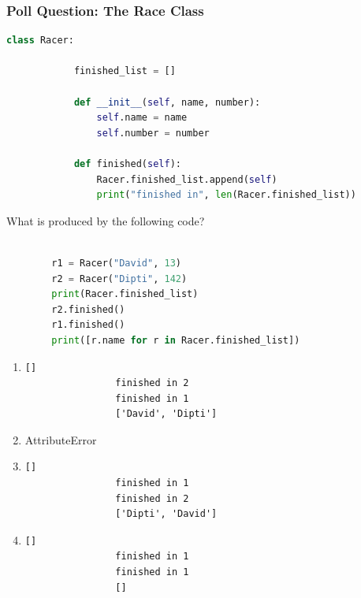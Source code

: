 \documentclass{beamer}
\begin{document}
%
%
%
\begin{frame}[fragile]
	\frametitle{Poll Question: The Race Class}
	\begin{minipage}{0.69\textwidth}
		\begin{lstlisting}[language=Python, autogobble, basicstyle=\tiny]
		class Racer:

			finished_list = []

			def __init__(self, name, number):
				self.name = name
				self.number = number

			def finished(self):
				Racer.finished_list.append(self)
				print("finished in", len(Racer.finished_list))

		\end{lstlisting}
		\pause
		\vspace{0.5cm}
		What is produced by the following code?
		\vfill
		\begin{lstlisting}[language=Python, autogobble, basicstyle=\tiny]

		r1 = Racer("David", 13)
		r2 = Racer("Dipti", 142)
		print(Racer.finished_list)
		r2.finished()
		r1.finished()
		print([r.name for r in Racer.finished_list])
		\end{lstlisting}
	\end{minipage}
	\hfill
	\begin{minipage}{0.29\textwidth}
		\begin{enumerate}[A]
			\item 
				\begin{lstlisting}[autogobble, basicstyle=\tiny]
				[]
				finished in 2
				finished in 1
				['David', 'Dipti']
				\end{lstlisting}
			\item AttributeError
			\item 
				\begin{lstlisting}[autogobble, basicstyle=\tiny]
				[]
				finished in 1
				finished in 2
				['Dipti', 'David']
				\end{lstlisting}
			\item 
				\begin{lstlisting}[autogobble, basicstyle=\tiny]
				[]
				finished in 1
				finished in 1
				[]
				\end{lstlisting}
		\end{enumerate}
	\end{minipage}
\end{frame}
\end{document}
